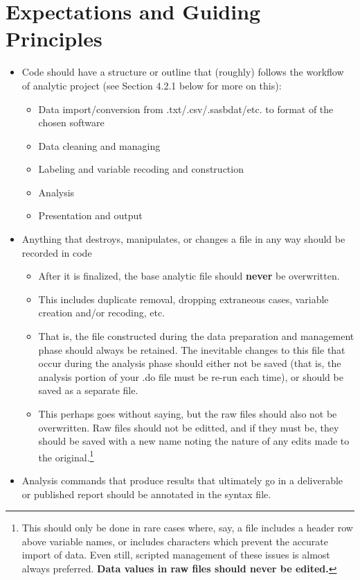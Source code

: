 \documentclass[11pt]{article}
\begin{document}
\section{Expectations and Guiding Principles} \label{sec:expectations}
\begin{itemize}
\item Code should have a structure or outline that (roughly) follows the workflow of analytic project (see Section 4.2.1 below for more on this):
	\begin{itemize}
		\item Data import/conversion from .txt/.csv/.sasbdat/etc. to format of the chosen software
		\item Data cleaning and managing
		\item Labeling and variable recoding and construction
		\item Analysis
		\item Presentation and output
	\end{itemize}
\item Anything that destroys, manipulates, or changes a file in any way should be recorded in code
	\begin{itemize}
		\item After it is finalized, the base analytic file should \textbf{never} be overwritten.
		\item This includes duplicate removal, dropping extraneous cases, variable creation and/or recoding, etc.
		\item That is, the file constructed during the data preparation and management phase should always be retained. The inevitable changes to this file that occur during the analysis phase should either not be saved (that is, the analysis portion of your .do file must be re-run each time), or should be saved as a separate file.
		\item This perhaps goes without saying, but the raw files should also not be overwritten. Raw files should not be editted, and if they must be, they should be saved with a new name noting the nature of any edits made to the original.\footnote{This should only be done in rare cases where, say, a file includes a header row above variable names, or includes characters which prevent the accurate import of data. Even still, scripted management of these issues is almost always preferred. \bf{Data values in raw files should never be edited}.}
	\end{itemize}
\item Analysis commands that produce results that ultimately go in a deliverable or published report should be annotated in the syntax file.

\end{itemize}
\end{document}

